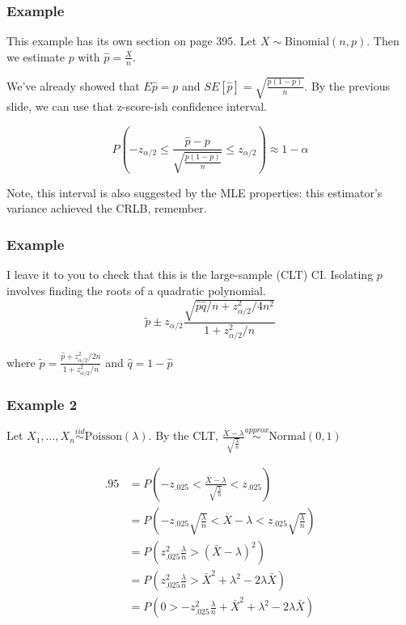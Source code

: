 \documentclass{beamer}
\begin{document}
\begin{frame}
\frametitle{Example}

This example has its own section on page 395. Let $X \sim \text{Binomial}(n,p)$. Then we estimate $p$ with $\hat{p} = \frac{X}{n}$.
\newline

We've already showed that $E\hat{p} = p$ and $SE[\hat{p}] = \sqrt{\frac{p(1-p)}{n}}$. By the previous slide, we can use that z-score-ish confidence interval. 

\[
P \left( - z_{\alpha/2} \le \frac{\hat{p} - p}{\sqrt{\frac{p(1-p)}{n} } } \le z_{\alpha/2} \right) \approx 1 - \alpha
\]

Note, this interval is also suggested by the MLE properties: this estimator's variance achieved the CRLB, remember.
\end{frame}

\begin{frame}
\frametitle{Example}

I leave it to you to check that this is the large-sample (CLT) CI. Isolating $p$ involves finding the roots of a quadratic polynomial. 
\[
\tilde{p} \pm z_{\alpha/2} \frac{\sqrt{\hat{p}\hat{q}/n + z_{\alpha/2}^2/4n^2 } }{1 + z_{\alpha/2}^2/n}
\]

where $\tilde{p} = \frac{\hat{p}+ z_{\alpha/2}^2/2n }{1  + z_{\alpha/2}^2/n }$ and $\hat{q} = 1 - \hat{p}$

\end{frame}


\begin{frame}
\frametitle{Example 2}

Let $X_1, \ldots, X_n \overset{iid}{\sim} \text{Poisson}( \lambda )$. By the CLT, $\frac{\bar{X} - \lambda}{\sqrt{\frac{\lambda }{n}} } \overset{approx}{\sim} \text{Normal}(0,1 )$

\begin{align*}
.95 &= P \left( -z_{.025} < \frac{\bar{X} - \lambda}{\sqrt{\frac{\lambda}{n}}} < z_{.025} \right) \\
&= P \left(-z_{.025}\sqrt{\frac{\lambda}{n}} < \bar{X} - \lambda < z_{.025} \sqrt{\frac{\lambda}{n}} \right) \\
&= P\left( z_{.025}^2 \frac{\lambda}{n} > (\bar{X} - \lambda)^2 \right) \\
&= P\left( z_{.025}^2 \frac{\lambda}{n} > \bar{X}^2 + \lambda^2 - 2 \lambda \bar{X} \right) \\
&=P\left( 0 > -z_{.025}^2 \frac{\lambda}{n} + \bar{X}^2 + \lambda^2 - 2 \lambda \bar{X} \right) \\
\end{align*}

\end{frame}
\end{document}
